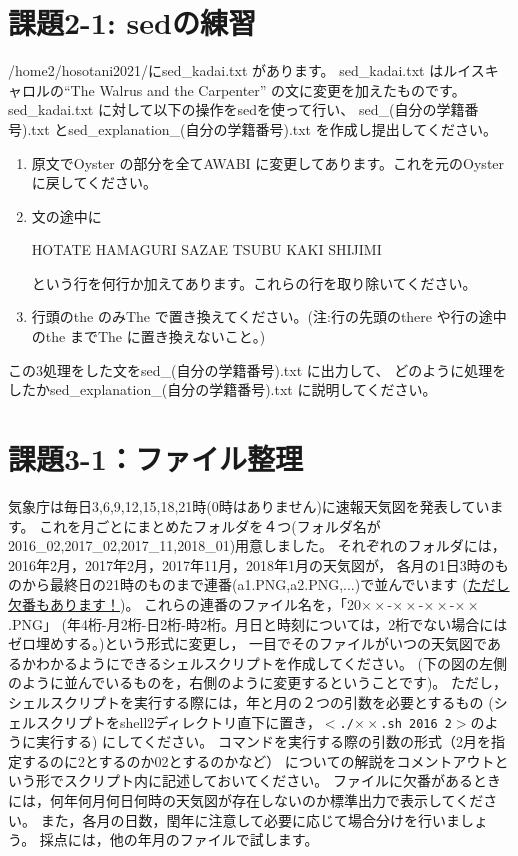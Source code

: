 \documentclass[a4j]{ltjsreport}
\begin{document}
    \section{課題2-1: sedの練習}
    /home2/hosotani2021/にsed\_kadai.txt があります。
    sed\_kadai.txt はルイスキャロルの``The Walrus and the Carpenter'' の文に変更を加えたものです。
    sed\_kadai.txt に対して以下の操作をsedを使って行い、
    sed\_(自分の学籍番号).txt とsed\_explanation\_(自分の学籍番号).txt を作成し提出してください。
    \begin{enumerate}
        \item 原文でOyster の部分を全てAWABI に変更してあります。これを元のOyster に戻してください。
        \item 文の途中に\begin{center} HOTATE HAMAGURI SAZAE TSUBU KAKI SHIJIMI \end{center}という行を何行か加えてあります。これらの行を取り除いてください。
        \item 行頭のthe のみThe で置き換えてください。(注:行の先頭のthere や行の途中のthe までThe に置き換えないこと。)
    \end{enumerate}
    この3処理をした文をsed\_(自分の学籍番号).txt に出力して、
    どのように処理をしたかsed\_explanation\_(自分の学籍番号).txt に説明してください。

    \section{課題3-1：ファイル整理}
    気象庁は毎日3,6,9,12,15,18,21時(0時はありません)に速報天気図を発表しています。
    これを月ごとにまとめたフォルダを４つ(フォルダ名が2016\_02,2017\_02,2017\_11,2018\_01)用意しました。
    それぞれのフォルダには，2016年2月，2017年2月，2017年11月，2018年1月の天気図が，
    各月の1日3時のものから最終日の21時のものまで連番(a1.PNG,a2.PNG,...)で並んでいます
    (\underline{ただし欠番もあります！})。
    これらの連番のファイル名を，「20$\times\times$-$\times\times$-$\times\times$-$\times\times$.PNG」
    (年4桁-月2桁-日2桁-時2桁。月日と時刻については，2桁でない場合にはゼロ埋めする。)という形式に変更し，
    一目でそのファイルがいつの天気図であるかわかるようにできるシェルスクリプトを作成してください。
    (下の図の左側のように並んでいるものを，右側のように変更するということです)。
    ただし，シェルスクリプトを実行する際には，年と月の２つの引数を必要とするもの
    (シェルスクリプトをshell2ディレクトリ直下に置き，$<$\texttt{./$\times\times$.sh 2016 2}$>$のように実行する)
    にしてください。
    コマンドを実行する際の引数の形式（2月を指定するのに2とするのか02とするのかなど）
    についての解説をコメントアウトという形でスクリプト内に記述しておいてください。
    ファイルに欠番があるときには，何年何月何日何時の天気図が存在しないのか標準出力で表示してください。
    また，各月の日数，閏年に注意して必要に応じて場合分けを行いましょう。
    採点には，他の年月のファイルで試します。
\end{document}
